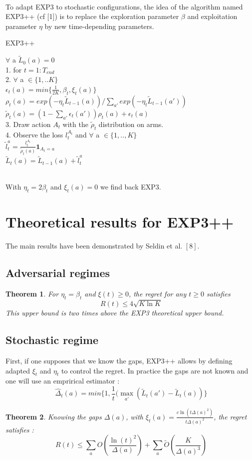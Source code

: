 \documentclass[11pt]{article}
\newtheorem{theorem}{Theorem}
\begin{document}
~\\
To adapt EXP3 to stochastic configurations, the idea of the algorithm named EXP3++ (cf [1]) is to replace the exploration parameter $\beta$ and exploitation parameter $\eta$ by new time-depending parameters.
~\\
\FloatBarrier
\begin{algorithm}
\caption{EXP3++}\label{RS}
$\forall$ a $\tilde{L}_{0}(a)=0$\\
1. for $t=1:T_{end}$~\\
2. $\forall$ a $\in \{1,..K\}$\\
 $\epsilon_{t}(a)=min\{\frac{1}{2K}, \beta_{t}, \xi_{t}(a)\}$ \\
$\rho_{t}(a)=exp(-\eta_{t}\tilde{L}_{t-1}(a))/\sum_{a'}exp(-\eta_{t}\tilde{L}_{t-1}(a'))$\\
$\tilde{\rho}_{t}(a)=(1-\sum_{a'}\epsilon_{t}(a'))\rho_{t}(a)+\epsilon_{t}(a)$\\
3. Draw action $A_{t}$ with the $\tilde{\rho}_{t}$ distribution on arms.~\\
4. Observe the loss $l_{t}^{A_{t}}$ and $\forall$ a $\in \{1,..,K\}$\\
$\tilde{l}_{t}^{a}=\frac{l_{t}^{A_{t}}}{\tilde{\rho}_{t}(a)} \textbf{1}_{A_{t}=a}$\\
$\tilde{L}_{t}(a)=\tilde{L}_{t-1}(a)+\tilde{l}_{t}^{a}$
\end{algorithm}
\FloatBarrier~\\
With $\eta_{t}=2\beta_{t}$ and $\xi_{t}(a)=0$ we find back EXP3.


\section*{Theoretical results for EXP3++}
The main results have been demonstrated by Seldin et al. $[8]$.

\subsection*{Adversarial regimes}

\begin{theorem}
For $\eta_{t}=\beta_{t}$ and $\xi(t) \geq 0$, the regret for any $t\geq0$ satisfies $$R(t) \leq 4\sqrt{K\ln K}$$ This upper bound is two times above the EXP3 theoretical upper bound.
\end{theorem}

\subsection*{Stochastic regime}
First, if one supposes that we know the gaps, EXP3++ allows by defining adapted $\xi_{t}$ and $\eta_{t}$ to control the regret. In practice the gaps are not known and one will use an emprirical estimator : $$\hat{\Delta}_{t}(a)=min\{1,\frac{1}{t}(\max_{a'}(\tilde{L}_{t}(a')-\tilde{L}_{t}(a))\}$$
\begin{theorem}
Knowing the gaps $\Delta(a)$, with $\xi_{t}(a)=\frac{c\ln(t\Delta(a)^{2})}{t\Delta(a)^{2}}$, the regret satisfies :
$$R(t) \leq \sum_{a} O(\frac{\ln(t)^{2}}{\Delta(a)})+\sum_{a}\tilde{O}(\frac{K}{\Delta(a)^{3}})$$
\end{theorem}
\end{document}
